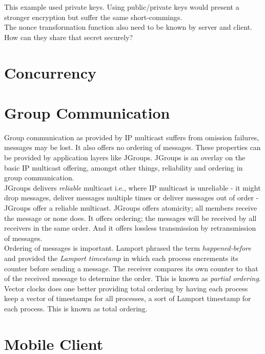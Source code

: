 This example used private keys. Using public/private keys would present a stronger encryption but suffer the same short-commings. \\

The nonce transformation function also need to be known by server and client. How can they share that secret securely?

\section{Concurrency}
\section{Group Communication}
Group communication as provided by IP multicast suffers from omission failures, messages may be lost. It also offers no ordering of messages. These properties can be provided by application layers like JGroups. JGroups is an overlay on the basic IP multicast offering, amongst other things, reliability and ordering in group communication. \\

JGroups delivers \emph{reliable} multicast i.e., where IP multicast is unreliable - it might drop messages, deliver messages multiple times or deliver messages out of order - JGroups offer a reliable multicast. JGroups offers atomicity; all members receive the message or none does. It offers ordering; the messages will be received by all receivers in the same order. And it offers lossless transmission by retransmission of messages.\\

Ordering of messages is important. Lamport phrased the term \emph{happened-before} and provided the \emph{Lamport timestamp} in which each process encrements its counter before sending a message. The receiver compares its own counter to that of the received message to determine the order. This is known as \emph{partial ordering}.\\

Vector clocks does one better providing total ordering by having each process keep a vector of timestamps for all processes, a sort of Lamport timestamp for each process. This is known as total ordering. \\

\section{Mobile Client}